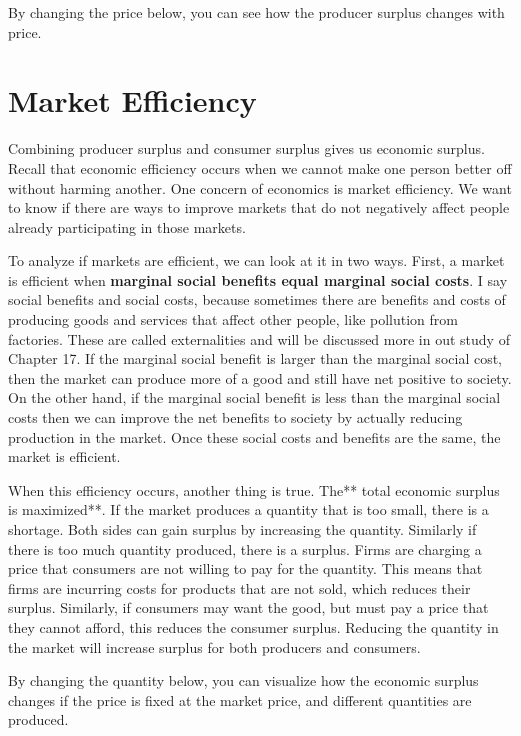 \documentclass[
]{book}
\begin{document}
By changing the price below, you can see how the producer surplus changes with price.

\section{Market Efficiency}\label{market-efficiency}

Combining producer surplus and consumer surplus gives us economic surplus. Recall that economic efficiency occurs when we cannot make one person better off without harming another. One concern of economics is market efficiency. We want to know if there are ways to improve markets that do not negatively affect people already participating in those markets.

To analyze if markets are efficient, we can look at it in two ways. First, a market is efficient when \textbf{marginal social benefits equal marginal social costs}. I say social benefits and social costs, because sometimes there are benefits and costs of producing goods and services that affect other people, like pollution from factories. These are called externalities and will be discussed more in out study of Chapter 17. If the marginal social benefit is larger than the marginal social cost, then the market can produce more of a good and still have net positive to society. On the other hand, if the marginal social benefit is less than the marginal social costs then we can improve the net benefits to society by actually reducing production in the market. Once these social costs and benefits are the same, the market is efficient.

When this efficiency occurs, another thing is true. The** total economic surplus is maximized**. If the market produces a quantity that is too small, there is a shortage. Both sides can gain surplus by increasing the quantity. Similarly if there is too much quantity produced, there is a surplus. Firms are charging a price that consumers are not willing to pay for the quantity. This means that firms are incurring costs for products that are not sold, which reduces their surplus. Similarly, if consumers may want the good, but must pay a price that they cannot afford, this reduces the consumer surplus. Reducing the quantity in the market will increase surplus for both producers and consumers.

By changing the quantity below, you can visualize how the economic surplus changes if the price is fixed at the market price, and different quantities are produced.
\end{document}

